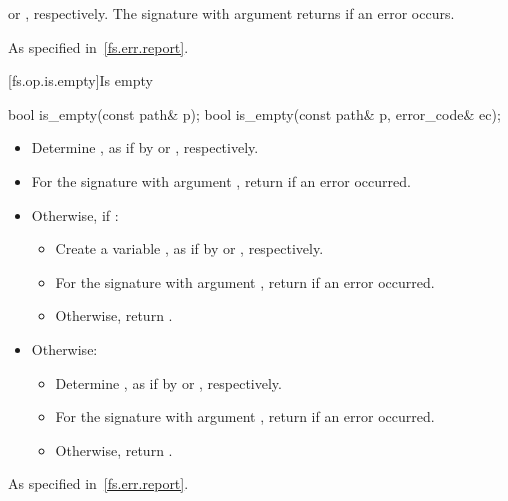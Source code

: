 \begin{itemdescr}
\pnum
\returns
{} or ,
  respectively. The signature with argument
   returns  if an error occurs.

\pnum
\throws
As specified in~\ref{fs.err.report}.
\end{itemdescr}


[fs.op.is.empty]{Is empty}

%
\begin{itemdecl}
bool is_empty(const path& p);
bool is_empty(const path& p, error_code& ec);
\end{itemdecl}

\begin{itemdescr}
\pnum
\effects
\begin{itemize}
\item Determine ,
   as if by  or , respectively.
\item For the signature with argument ,
   return  if an error occurred.
\item Otherwise, if :
  \begin{itemize}
  \item Create a variable ,
     as if by  or
     , respectively.
  \item For the signature with argument ,
     return  if an error occurred.
  \item Otherwise, return .
  \end{itemize}
\item
Otherwise:
  \begin{itemize}
  \item Determine ,
    as if by  or , respectively.
  \item For the signature with argument ,
    return  if an error occurred.
  \item Otherwise, return .
  \end{itemize}
\end{itemize}

\pnum
\throws
As specified in~\ref{fs.err.report}.
\end{itemdescr}


